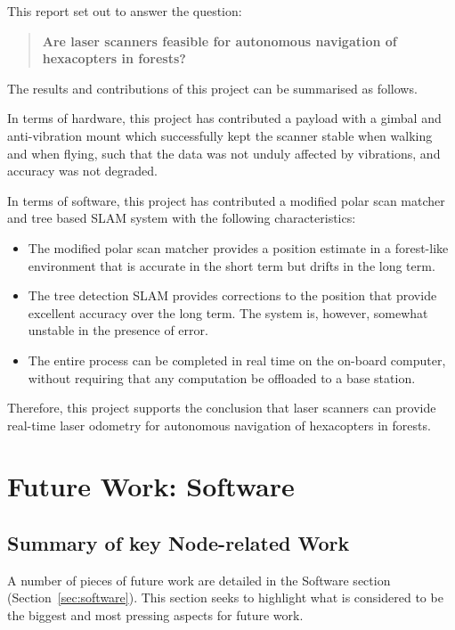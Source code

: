 \documentclass[12pt,oneside,a4paper]{book}
\begin{document}
This report set out to answer the question: 
\begin{quote}
  \textbf{Are laser scanners feasible for autonomous navigation of
    hexacopters in forests?}
\end{quote}

The results and contributions of this project can be summarised as follows.

In terms of hardware, this project has contributed a payload with a
gimbal and anti-vibration mount which successfully kept the scanner
stable when walking and when flying, such that the data was not unduly
affected by vibrations, and accuracy was not degraded.

In terms of software, this project has contributed a modified polar
scan matcher and tree based SLAM system with the following
characteristics:
\begin{itemize}
\item The modified polar scan matcher provides a position estimate in
  a forest-like environment that is accurate in the short term but
  drifts in the long term.
\item The tree detection SLAM provides corrections to the position
  that provide excellent accuracy over the long term. The system is,
  however, somewhat unstable in the presence of error.
\item The entire process can be completed in real time on the on-board
  computer, without requiring that any computation be offloaded to a
  base station.
\end{itemize}

Therefore, this project supports the conclusion that laser scanners
can provide real-time laser odometry for autonomous navigation of
hexacopters in forests.


\section{Future Work: Software}
\label{sec:softw-future-work}

\subsection{Summary of key Node-related Work}
\label{sec:summary-key-node}

A number of pieces of future work are detailed in the Software
section (Section~\ref{sec:software}). This section seeks to highlight
what is considered to be the biggest and most pressing aspects for
future work.
\end{document}
